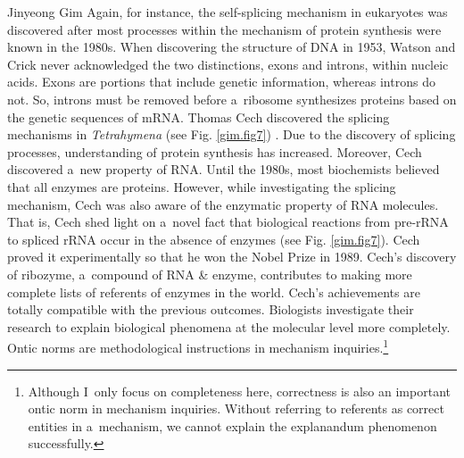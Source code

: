 \begin{artengenv}{Jinyeong Gim}
Again, for instance, the self-splicing mechanism in eukaryotes was discovered after most processes within the mechanism of protein synthesis were known in the 1980s. When discovering the structure of DNA in 1953, Watson and Crick never acknowledged the two distinctions, exons and introns, within nucleic acids. Exons are portions that include genetic information, whereas introns do not. So, introns must be removed before a~ribosome synthesizes proteins based on the genetic sequences of mRNA. Thomas Cech discovered the splicing mechanisms in \textit{Tetrahymena} (see Fig. \ref{gim.fig7})
\parencite[][]{zaug_autocatalytic_1983}. %
 Due to the discovery of splicing processes, understanding of protein synthesis has increased. Moreover, Cech discovered a~new property of RNA. Until the 1980s, most biochemists believed that all enzymes are proteins. However, while investigating the splicing mechanism, Cech was also aware of the enzymatic property of RNA molecules. That is, Cech shed light on a~novel fact that biological reactions from pre-rRNA to spliced rRNA occur in the absence of enzymes (see Fig. \ref{gim.fig7}). Cech 
\parencite*[][]{cech_model_1986} %
 proved it experimentally so that he won the Nobel Prize in 1989. Cech's discovery of ribozyme, a~compound of RNA \& enzyme, contributes to making more complete lists of referents of enzymes in the world. Cech's achievements are totally compatible with the previous outcomes. Biologists investigate their research to explain biological phenomena at the molecular level more completely. Ontic norms are methodological instructions in mechanism inquiries.\footnote{Although I~only focus on completeness here, correctness is also an important ontic norm in mechanism inquiries. Without referring to referents as correct entities in a~mechanism, we cannot explain the explanandum phenomenon successfully.}


\end{artengenv}
